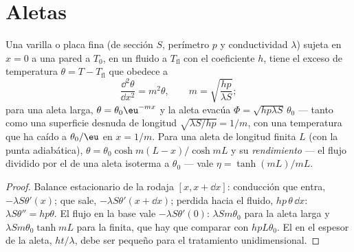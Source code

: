 \section{Aletas}

\begin{proposition}\label{prop:b2:heat-conduction:fin}
Una varilla o placa fina (de sección $S$, perímetro $p$ y conductividad $\lambda$)
sujeta en $x = 0$ a una pared a $T_0$, en un fluido a $T_{\text{fl}}$ con
el coeficiente $h$, tiene el exceso de temperatura $\theta = T - T_{\text{fl}}$
que obedece a
\[
\frac{\dd^2\theta}{\dd x^2} = m^2\theta, \qquad m = \sqrt{\frac{hp}{\lambda S}} ;
\]
para una aleta larga, $\theta = \theta_0\eu^{-mx}$ y la aleta evacúa $\Phi =
\sqrt{hp\lambda S}\,\theta_0$ --- tanto como una superficie desnuda de longitud $\sqrt{\lambda
S/hp} = 1/m$, con una temperatura que ha caído a $\theta_0/\eu$ en
$x = 1/m$. Para una aleta de longitud finita $L$ (con la punta adiabática), $\theta =
\theta_0\cosh m(L-x)/\cosh mL$ y su \emph{rendimiento} --- el flujo dividido por el de una aleta isoterma a $\theta_0$ ---
vale $\eta = \tanh(mL)/mL$.
\end{proposition}

\begin{proof}
Balance estacionario de la rodaja $[x, x + \dd x]$: conducción que entra,
$-\lambda S\theta'(x)$; que sale, $-\lambda S\theta'(x + \dd x)$; perdida hacia el
fluido, $hp\,\theta\,\dd x$: $\lambda S\theta'' = hp\theta$. El flujo en la
base vale $-\lambda S\theta'(0)$: $\lambda Sm\theta_0$ para la aleta larga y
$\lambda Sm\theta_0\tanh mL$ para la finita, que hay que comparar con
$hpL\theta_0$. El  en el espesor de la aleta, $ht/\lambda$, debe
ser pequeño para el tratamiento unidimensional.
\end{proof}

